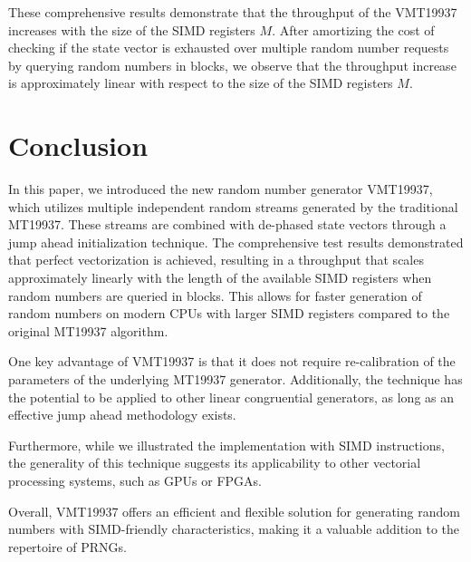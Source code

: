 \documentclass[preprint,1p,times]{elsarticle}
\begin{document}
			These comprehensive results demonstrate that the throughput of the VMT19937 increases with the size of the SIMD registers $M$. After amortizing the cost of checking if the state vector is exhausted over multiple random number requests by querying random numbers in blocks, we observe that the throughput increase is approximately linear with respect to the size of the SIMD registers $M$.
			
			\section{Conclusion}
			In this paper, we introduced the new random number generator VMT19937, which utilizes multiple independent random streams generated by the traditional MT19937. These streams are combined with de-phased state vectors through a jump ahead initialization technique. The comprehensive test results demonstrated that perfect vectorization is achieved, resulting in a throughput that scales approximately linearly with the length of the available SIMD registers when random numbers are queried in blocks. This allows for faster generation of random numbers on modern CPUs with larger SIMD registers compared to the original MT19937 algorithm.
			
			One key advantage of VMT19937 is that it does not require re-calibration of the parameters of the underlying MT19937 generator. Additionally, the technique has the potential to be applied to other linear congruential generators, as long as an effective jump ahead methodology exists.
			
			Furthermore, while we illustrated the implementation with SIMD instructions, the generality of this technique suggests its applicability to other vectorial processing systems, such as GPUs or FPGAs.
			
			Overall, VMT19937 offers an efficient and flexible solution for generating random numbers with SIMD-friendly characteristics, making it a valuable addition to the repertoire of PRNGs.
			
\end{document}
